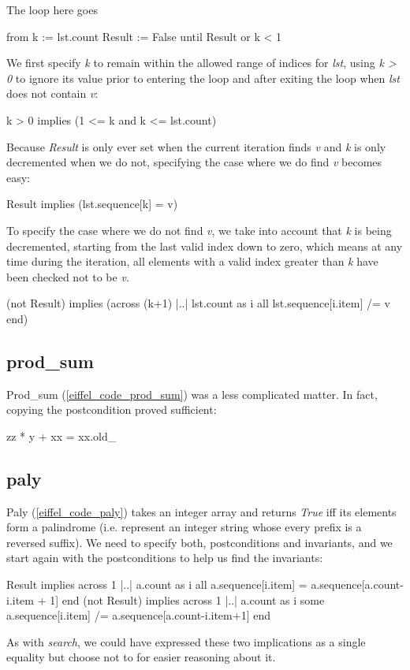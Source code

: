 The loop here goes
\begin{eSimple}
from
	k := lst.count
	Result := False
until
	Result or k < 1
\end{eSimple}
We first specify \emph{k} to remain within the allowed range of indices for \emph{lst}, using \emph{k > 0} to ignore its value prior to entering the loop and after exiting the loop when \emph{lst} does not contain \emph{v}:
\begin{eSimple}
k > 0 implies (1 <= k and k <= lst.count)
\end{eSimple}

Because \emph{Result} is only ever set when the current iteration finds \emph{v} and \emph{k} is only decremented when we do not, specifying the case where we do find \emph{v} becomes easy:
\begin{eSimple}
Result implies (lst.sequence[k] = v)
\end{eSimple}
To specify the case where we do not find \emph{v}, we take into account that \emph{k} is being decremented, starting from the last valid index down to zero, which means at any time during the iteration, all elements with a valid index greater than \emph{k} have been checked not to be \emph{v}.
\begin{eSimple}
(not Result) implies (across (k+1) |..| lst.count as i all lst.sequence[i.item] /= v end)
\end{eSimple}

\subsection{prod\_sum}
Prod\_sum (\ref{eiffel_code_prod_sum}) was a less complicated matter. In fact, copying the postcondition proved sufficient:
\begin{eSimple}
zz * y + xx = xx.old_
\end{eSimple}

\subsection{paly}
Paly (\ref{eiffel_code_paly}) takes an integer array and returns \emph{True} iff its elements form a palindrome (i.e. represent an integer string whose every prefix is a reversed suffix). We need to specify both, postconditions and invariants, and we start again with the postconditions to help us find the invariants:\\
\begin{eSimple}
Result implies across 1 |..| a.count as i all a.sequence[i.item] = a.sequence[a.count-i.item + 1] end
(not Result) implies across 1 |..| a.count as i some a.sequence[i.item] /= a.sequence[a.count-i.item+1] end
\end{eSimple}
As with \emph{search}, we could have expressed these two implications as a single equality but choose not to for easier reasoning about it.\\

